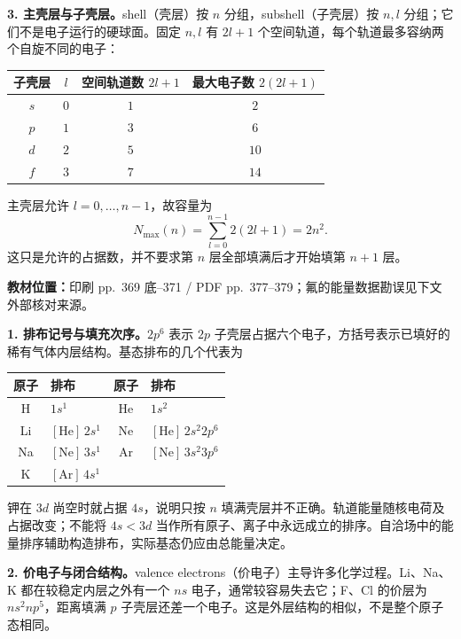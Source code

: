 \textbf{3. 主壳层与子壳层。}shell（壳层）按 $n$ 分组，subshell（子壳层）按 $n,l$ 分组；它们不是电子运行的硬球面。固定 $n,l$ 有 $2l+1$ 个空间轨道，每个轨道最多容纳两个自旋不同的电子：
\begin{center}
\begin{tabular}{@{}cccc@{}}
  \toprule
  子壳层 & $l$ & 空间轨道数 $2l+1$ & 最大电子数 $2(2l+1)$ \\
  \midrule
  $s$ & $0$ & $1$ & $2$ \\
  $p$ & $1$ & $3$ & $6$ \\
  $d$ & $2$ & $5$ & $10$ \\
  $f$ & $3$ & $7$ & $14$ \\
  \bottomrule
\end{tabular}
\end{center}
主壳层允许 $l=0,\ldots,n-1$，故容量为
\begin{equation}
  \boxed{N_{\max}(n)=\sum_{l=0}^{n-1}2(2l+1)=2n^2.}
\end{equation}
这只是允许的占据数，并不要求第 $n$ 层全部填满后才开始填第 $n+1$ 层。

\textbf{教材位置：}印刷 pp.~369 底--371 / PDF pp.~377--379；氟的能量数据勘误见下文外部核对来源。

\textbf{1. 排布记号与填充次序。}$2p^6$ 表示 $2p$ 子壳层占据六个电子，方括号表示已填好的稀有气体内层结构。基态排布的几个代表为
\begin{center}
\begin{tabular}{@{}clcl@{}}
  \toprule
  原子 & 排布 & 原子 & 排布 \\
  \midrule
  H & $1s^1$ & He & $1s^2$ \\
  Li & $[\mathrm{He}]\,2s^1$ & Ne & $[\mathrm{He}]\,2s^2 2p^6$ \\
  Na & $[\mathrm{Ne}]\,3s^1$ & Ar & $[\mathrm{Ne}]\,3s^2 3p^6$ \\
  K & $[\mathrm{Ar}]\,4s^1$ & & \\
  \bottomrule
\end{tabular}
\end{center}
钾在 $3d$ 尚空时就占据 $4s$，说明只按 $n$ 填满壳层并不正确。轨道能量随核电荷及占据改变；不能将 $4s<3d$ 当作所有原子、离子中永远成立的排序。自洽场中的能量排序辅助构造排布，实际基态仍应由总能量决定。

\textbf{2. 价电子与闭合结构。}valence electrons（价电子）主导许多化学过程。Li、Na、K 都在较稳定内层之外有一个 $ns$ 电子，通常较容易失去它；F、Cl 的价层为 $ns^2np^5$，距离填满 $p$ 子壳层还差一个电子。这是外层结构的相似，不是整个原子态相同。

